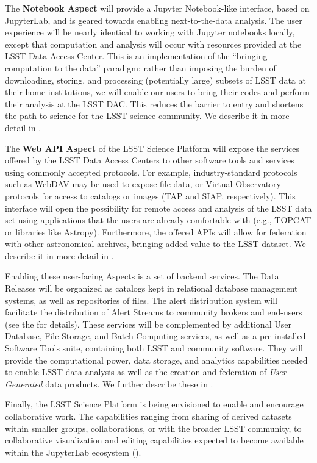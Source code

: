 The \textbf{Notebook Aspect} will provide a Jupyter Notebook-like interface,
based on JupyterLab, and is geared towards enabling next-to-the-data analysis.
The user experience will
be nearly identical to working with Jupyter notebooks locally, except that computation
and analysis will occur with resources provided at the LSST Data Access Center.
This is an
implementation of the ``bringing computation to the data'' paradigm: rather
than imposing the burden of downloading, storing, and processing (potentially large)
subsets of LSST data at their home institutions, we will enable our users to
bring their codes and perform their analysis at the LSST DAC.
This reduces the barrier to entry and shortens the path to science for
the LSST science community. We describe it in more detail in .

The \textbf{Web API Aspect} of the LSST Science Platform will expose the
services offered by the LSST Data Access Centers to other software tools and
services using commonly accepted protocols. For example, industry-standard
protocols such as WebDAV may be used to expose file data, or Virtual Observatory
protocols for access to catalogs or images (TAP and SIAP, respectively). This interface will open the
possibility for remote access and analysis of the LSST  data set using
applications that the users are already comfortable with (e.g., TOPCAT or libraries like Astropy).
Furthermore, the offered APIs will allow for federation
with other astronomical archives, bringing added value to the LSST dataset.
We describe it in more detail in .

Enabling these user-facing Aspects is a set of backend services.
The Data Releases will be organized as catalogs kept in relational database management systems, as well as repositories of files.
The alert distribution system will facilitate the distribution of Alert Streams to community brokers and end-users (see the \DPDD for details).
These services will be complemented by additional User Database, File Storage, and Batch Computing services, as well as a pre-installed Software Tools suite, containing both LSST and community software.
They will provide the computational power, data storage, and analytics capabilities needed to enable LSST data analysis as well as the creation and federation of \textit{User Generated} data products.
We further describe these in .

Finally, the LSST Science Platform is being envisioned to enable and encourage
collaborative work.  The capabilities ranging from sharing of derived
datasets within smaller groups, collaborations, or with the broader LSST
community, to collaborative visualization and editing capabilities expected
to become available within the JupyterLab ecosystem ().
